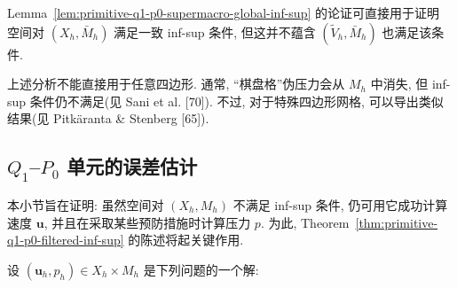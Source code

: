 \setcounter{statement}{0}
\renewcommand{\theHstatement}{remark.\thesection.\arabic{statement}}
\begin{Remark}\label{rem:primitive-q1-p0-xh-bar-mh}
Lemma~\ref{lem:primitive-q1-p0-supermacro-global-inf-sup} 的论证可直接用于证明
空间对 $(X_h,\bar M_h)$ 满足一致 inf-sup 条件, 但这并不蕴含
$(\widetilde V_h,\bar M_h)$ 也满足该条件.
\end{Remark}

\setcounter{statement}{1}
\renewcommand{\theHstatement}{remark.\thesection.\arabic{statement}}
\begin{Remark}\label{rem:primitive-q1-p0-general-quadrilaterals}
上述分析不能直接用于任意四边形. 通常, ``棋盘格''伪压力会从 $M_h$ 中消失,
但 inf-sup 条件仍不满足(见 Sani et al. [70]). 不过, 对于特殊四边形网格,
可以导出类似结果(见 Pitkäranta \& Stenberg [65]).
\end{Remark}

\subsection{$Q_1$--$P_0$ 单元的误差估计}
\label{subsec:primitive-q1-p0-error-estimates}

本小节旨在证明: 虽然空间对 $(X_h,M_h)$ 不满足 inf-sup 条件,
仍可用它成功计算速度 $\mathbf u$, 并且在采取某些预防措施时计算压力 $p$.
为此, Theorem~\ref{thm:primitive-q1-p0-filtered-inf-sup} 的陈述将起关键作用.

设 $(\mathbf u_h,p_h)\in X_h\times M_h$ 是下列问题的一个解:

